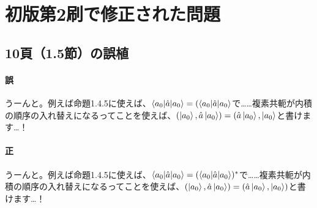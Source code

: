 \documentclass[_main]{subfiles}
\begin{document}
\section{初版第2刷で修正された問題}
\subsection{10頁（1.5節）の誤植}
\paragraph{誤} うーんと。例えば命題1.4.5に使えば、$\braket{a_0|\hat{a}|a_0} = (\braket{a_0|\hat{a}|a_0}$で……複素共軛が内積の順序の入れ替えになるってことを使えば、$(\ket{a_0}, \hat{a}\ket{a_0}) = (\hat{a}\ket{a_0}, \ket{a_0}$と書けます…！

\paragraph{正} うーんと。例えば命題1.4.5に使えば、$\braket{a_0|\hat{a}|a_0} = (\braket{a_0|\hat{a}|a_0})^\ast$で……複素共軛が内積の順序の入れ替えになるってことを使えば、$(\ket{a_0}, \hat{a}\ket{a_0}) = (\hat{a}\ket{a_0}, \ket{a_0})$と書けます…！
\end{document}
